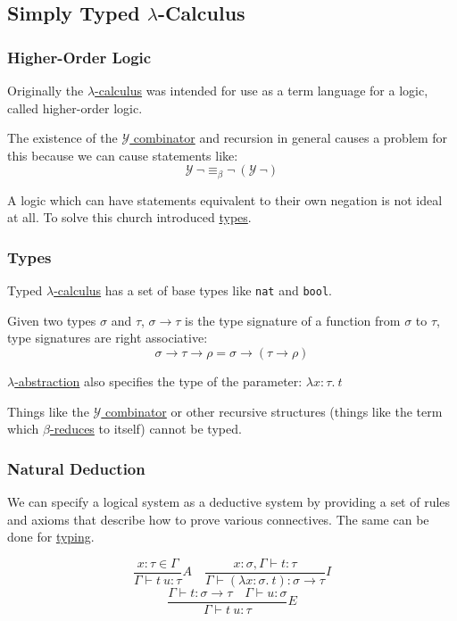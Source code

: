 \documentclass{article}
\begin{document}
\subsection{Simply Typed $\lambda$-Calculus}
\subsubsection{Higher-Order Logic}
Originally the \hyperref[lambda-calculus]{$\lambda$-calculus} was intended for use as a term language for a logic, called higher-order logic.

The existence of the \hyperref[y-combinator]{$\mathcal{Y}$ combinator} and recursion in general causes a problem for this because we can cause statements like:
\[\mathcal{Y} \: \neg \equiv_\beta \neg \: (\mathcal{Y} \: \neg)\]

A logic which can have statements equivalent to their own negation is not ideal at all. To solve this church introduced \hyperref[types]{types}.

\subsubsection{Types}\label{types}
Typed \hyperref[lambda-calculus]{$\lambda$-calculus} has a set of base types like \texttt{nat} and \texttt{bool}.

Given two types $\sigma$ and $\tau$, $\sigma \to \tau$ is the type signature of a function from $\sigma$ to $\tau$, type signatures are right associative:
\[\sigma \to \tau \to \rho = \sigma \to (\tau \to \rho)\]

\hyperref[lambda-abstraction]{$\lambda$-abstraction} also specifies the type of the parameter: $\lambda x : \tau.\:t$

Things like the \hyperref[y-combinator]{$\mathcal{Y}$ combinator} or other recursive structures (things like the term which \hyperref[beta-reduction]{$\beta$-reduces} to itself) cannot be typed.


\subsubsection{Natural Deduction}
We can specify a logical system as a deductive system by providing a set of rules and axioms that describe how to prove various connectives. The same can be done for \hyperref[types]{typing}.

\[\frac{x : \tau \in \Gamma}{\Gamma \vdash t \: u : \tau}A \quad \frac{x : \sigma, \Gamma \vdash t : \tau}{\Gamma \vdash (\lambda x : \sigma.\:t) : \sigma \to \tau}I\]
\[\frac{\Gamma \vdash t : \sigma \to \tau \quad \Gamma \vdash u : \sigma}{\Gamma \vdash t \: u : \tau}E\]
\end{document}
